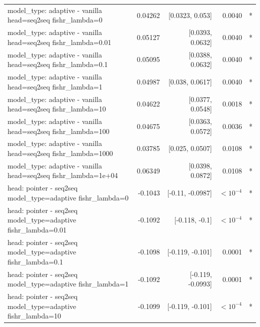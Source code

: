 \documentclass[10pt]{article}
\makeatletter
\newcommand{\stackcell}[1]{\begin{tabular}[t]{@{}l@{}}#1\end{tabular}}
\makeatother
\begin{document}
{\begin{longtable}{lrrrl}
\stackcell{model\_type: adaptive - vanilla\\\footnotesize head=seq2seq fishr\_lambda=0 } & 0.04262 & [0.0323, 0.053] & 0.0040 & *\\
\stackcell{model\_type: adaptive - vanilla\\\footnotesize head=seq2seq fishr\_lambda=0.01 } & 0.05127 & [0.0393, 0.0632] & 0.0040 & *\\
\stackcell{model\_type: adaptive - vanilla\\\footnotesize head=seq2seq fishr\_lambda=0.1 } & 0.05095 & [0.0388, 0.0632] & 0.0040 & *\\
\stackcell{model\_type: adaptive - vanilla\\\footnotesize head=seq2seq fishr\_lambda=1 } & 0.04987 & [0.038, 0.0617] & 0.0040 & *\\
\stackcell{model\_type: adaptive - vanilla\\\footnotesize head=seq2seq fishr\_lambda=10 } & 0.04622 & [0.0377, 0.0548] & 0.0018 & *\\
\stackcell{model\_type: adaptive - vanilla\\\footnotesize head=seq2seq fishr\_lambda=100 } & 0.04675 & [0.0363, 0.0572] & 0.0036 & *\\
\stackcell{model\_type: adaptive - vanilla\\\footnotesize head=seq2seq fishr\_lambda=1000 } & 0.03785 & [0.025, 0.0507] & 0.0108 & *\\
\stackcell{model\_type: adaptive - vanilla\\\footnotesize head=seq2seq fishr\_lambda=1e+04 } & 0.06349 & [0.0398, 0.0872] & 0.0108 & *\\
\stackcell{head: pointer - seq2seq\\\footnotesize model\_type=adaptive fishr\_lambda=0 } & -0.1043 & [-0.11, -0.0987] & $<10^{-4}$ & *\\
\stackcell{head: pointer - seq2seq\\\footnotesize model\_type=adaptive fishr\_lambda=0.01 } & -0.1092 & [-0.118, -0.1] & $<10^{-4}$ & *\\
\stackcell{head: pointer - seq2seq\\\footnotesize model\_type=adaptive fishr\_lambda=0.1 } & -0.1098 & [-0.119, -0.101] & 0.0001 & *\\
\stackcell{head: pointer - seq2seq\\\footnotesize model\_type=adaptive fishr\_lambda=1 } & -0.1092 & [-0.119, -0.0993] & 0.0001 & *\\
\stackcell{head: pointer - seq2seq\\\footnotesize model\_type=adaptive fishr\_lambda=10 } & -0.1099 & [-0.119, -0.101] & $<10^{-4}$ & *\\

\end{longtable}}
\end{document}
